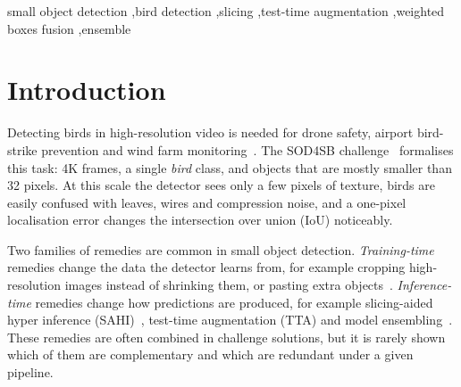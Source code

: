 \documentclass[5p,a4paper]{elsarticle}
\begin{document}
\begin{frontmatter}
\begin{keyword}
small object detection \sep bird detection \sep slicing \sep test-time augmentation \sep weighted boxes fusion \sep ensemble
\end{keyword}

\end{frontmatter}


\section{Introduction}
Detecting birds in high-resolution video is needed for drone safety, airport bird-strike prevention and wind
farm monitoring~\cite{fujii2021distant,sun2022airbirds,yoshihashi2017windfarm}. The SOD4SB
challenge~\cite{kondo2023sod4sb} formalises this task: 4K frames, a single \emph{bird} class, and objects that
are mostly smaller than 32 pixels. At this scale the detector sees only a few pixels of texture, birds are
easily confused with leaves, wires and compression noise, and a one-pixel localisation error changes the
intersection over union (IoU) noticeably.

Two families of remedies are common in small object detection. \emph{Training-time} remedies change the data the
detector learns from, for example cropping high-resolution images instead of shrinking them, or pasting extra
objects~\cite{ghiasi2021copypaste}. \emph{Inference-time} remedies change how predictions are produced, for example
slicing-aided hyper inference (SAHI)~\cite{akyon2022sahi}, test-time augmentation (TTA) and model
ensembling~\cite{solovyev2021wbf,hou2023ensemble}. These remedies are often combined in challenge solutions,
but it is rarely shown which of them are complementary and which are redundant under a given pipeline.
\end{document}
